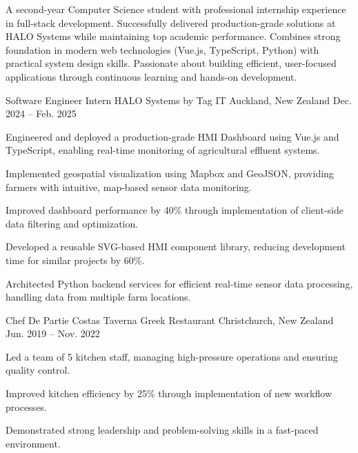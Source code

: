 \documentclass[11pt, a4paper]{awesome-cv}
\begin{document}
\makecvheader[C]

\begin{cventries}
A second-year Computer Science student with professional internship experience in full-stack development. Successfully delivered production-grade solutions at HALO Systems while maintaining top academic performance. Combines strong foundation in modern web technologies (Vue.js, TypeScript, Python) with practical system design skills. Passionate about building efficient, user-focused applications through continuous learning and hands-on development.
\end{cventries}

\begin{cventries}
  \cventry
    {Software Engineer Intern} %
    {HALO Systems by Tag IT} %
    {Auckland, New Zealand} %
    {Dec. 2024 -- Feb. 2025} %
    {
      \begin{cvitems}
        \item {Engineered and deployed a production-grade HMI Dashboard using Vue.js and TypeScript, enabling real-time monitoring of agricultural effluent systems.}
        \item {Implemented geospatial visualization using Mapbox and GeoJSON, providing farmers with intuitive, map-based sensor data monitoring.}
        \item {Improved dashboard performance by 40\% through implementation of client-side data filtering and optimization.}
        \item {Developed a reusable SVG-based HMI component library, reducing development time for similar projects by 60\%.}
        \item {Architected Python backend services for efficient real-time sensor data processing, handling data from multiple farm locations.}
      \end{cvitems}
    }
  \cventry
    {Chef De Partie} %
    {Costas Taverna Greek Restaurant} %
    {Christchurch, New Zealand} %
    {Jun. 2019 -- Nov. 2022} %
    {
      \begin{cvitems}
        \item {Led a team of 5 kitchen staff, managing high-pressure operations and ensuring quality control.}
        \item {Improved kitchen efficiency by 25\% through implementation of new workflow processes.}
        \item {Demonstrated strong leadership and problem-solving skills in a fast-paced environment.}
      \end{cvitems}
    }
\end{cventries}
\end{document}
